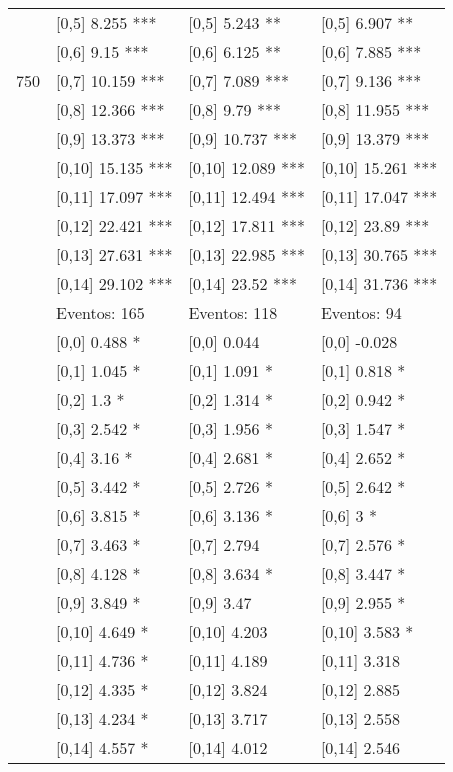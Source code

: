 \begin{table}
\begin{tabular}[t]{llll}
 & {}[0,5] 8.255 *** & {}[0,5] 5.243 ** & {}[0,5] 6.907 **\\
 & {}[0,6] 9.15 *** & {}[0,6] 6.125 ** & {}[0,6] 7.885 ***\\
750 & {}[0,7] 10.159 *** & {}[0,7] 7.089 *** & {}[0,7] 9.136 ***\\
\addlinespace
 & {}[0,8] 12.366 *** & {}[0,8] 9.79 *** & {}[0,8] 11.955 ***\\
 & {}[0,9] 13.373 *** & {}[0,9] 10.737 *** & {}[0,9] 13.379 ***\\
 & {}[0,10] 15.135 *** & {}[0,10] 12.089 *** & {}[0,10] 15.261 ***\\
 & {}[0,11] 17.097 *** & {}[0,11] 12.494 *** & {}[0,11] 17.047 ***\\
 & {}[0,12] 22.421 *** & {}[0,12] 17.811 *** & {}[0,12] 23.89 ***\\
\addlinespace
 & {}[0,13] 27.631 *** & {}[0,13] 22.985 *** & {}[0,13] 30.765 ***\\
 & {}[0,14] 29.102 *** & {}[0,14] 23.52 *** & {}[0,14] 31.736 ***\\
 & Eventos:  165 & Eventos:  118 & Eventos:  94\\
 & {}[0,0] 0.488 * & {}[0,0] 0.044 & {}[0,0] -0.028\\
 & {}[0,1] 1.045 * & {}[0,1] 1.091 * & {}[0,1] 0.818 *\\
\addlinespace
 & {}[0,2] 1.3 * & {}[0,2] 1.314 * & {}[0,2] 0.942 *\\
 & {}[0,3] 2.542 * & {}[0,3] 1.956 * & {}[0,3] 1.547 *\\
 & {}[0,4] 3.16 * & {}[0,4] 2.681 * & {}[0,4] 2.652 *\\
 & {}[0,5] 3.442 * & {}[0,5] 2.726 * & {}[0,5] 2.642 *\\
 & {}[0,6] 3.815 * & {}[0,6] 3.136 * & {}[0,6] 3 *\\
\addlinespace
1000 & {}[0,7] 3.463 * & {}[0,7] 2.794 & {}[0,7] 2.576 *\\
 & {}[0,8] 4.128 * & {}[0,8] 3.634 * & {}[0,8] 3.447 *\\
 & {}[0,9] 3.849 * & {}[0,9] 3.47 & {}[0,9] 2.955 *\\
 & {}[0,10] 4.649 * & {}[0,10] 4.203 & {}[0,10] 3.583 *\\
 & {}[0,11] 4.736 * & {}[0,11] 4.189 & {}[0,11] 3.318\\
\addlinespace
 & {}[0,12] 4.335 * & {}[0,12] 3.824 & {}[0,12] 2.885\\
 & {}[0,13] 4.234 * & {}[0,13] 3.717 & {}[0,13] 2.558\\
 & {}[0,14] 4.557 * & {}[0,14] 4.012 & {}[0,14] 2.546\\
\bottomrule
\end{tabular}
\end{table}
